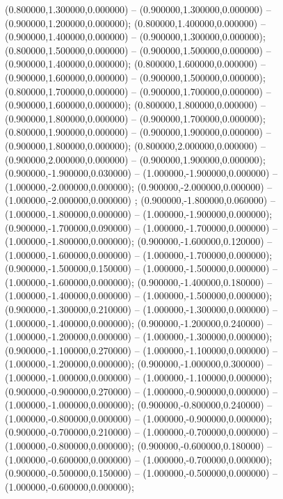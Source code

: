 (0.800000,1.300000,0.000000) -- (0.900000,1.300000,0.000000) -- (0.900000,1.200000,0.000000);
 (0.800000,1.400000,0.000000) -- (0.900000,1.400000,0.000000) -- (0.900000,1.300000,0.000000);
 (0.800000,1.500000,0.000000) -- (0.900000,1.500000,0.000000) -- (0.900000,1.400000,0.000000);
 (0.800000,1.600000,0.000000) -- (0.900000,1.600000,0.000000) -- (0.900000,1.500000,0.000000);
 (0.800000,1.700000,0.000000) -- (0.900000,1.700000,0.000000) -- (0.900000,1.600000,0.000000);
 (0.800000,1.800000,0.000000) -- (0.900000,1.800000,0.000000) -- (0.900000,1.700000,0.000000);
 (0.800000,1.900000,0.000000) -- (0.900000,1.900000,0.000000) -- (0.900000,1.800000,0.000000);
 (0.800000,2.000000,0.000000) -- (0.900000,2.000000,0.000000) -- (0.900000,1.900000,0.000000);
 (0.900000,-1.900000,0.030000) -- (1.000000,-1.900000,0.000000) -- (1.000000,-2.000000,0.000000);
 (0.900000,-2.000000,0.000000) -- (1.000000,-2.000000,0.000000) ;
 (0.900000,-1.800000,0.060000) -- (1.000000,-1.800000,0.000000) -- (1.000000,-1.900000,0.000000);
 (0.900000,-1.700000,0.090000) -- (1.000000,-1.700000,0.000000) -- (1.000000,-1.800000,0.000000);
 (0.900000,-1.600000,0.120000) -- (1.000000,-1.600000,0.000000) -- (1.000000,-1.700000,0.000000);
 (0.900000,-1.500000,0.150000) -- (1.000000,-1.500000,0.000000) -- (1.000000,-1.600000,0.000000);
 (0.900000,-1.400000,0.180000) -- (1.000000,-1.400000,0.000000) -- (1.000000,-1.500000,0.000000);
 (0.900000,-1.300000,0.210000) -- (1.000000,-1.300000,0.000000) -- (1.000000,-1.400000,0.000000);
 (0.900000,-1.200000,0.240000) -- (1.000000,-1.200000,0.000000) -- (1.000000,-1.300000,0.000000);
 (0.900000,-1.100000,0.270000) -- (1.000000,-1.100000,0.000000) -- (1.000000,-1.200000,0.000000);
 (0.900000,-1.000000,0.300000) -- (1.000000,-1.000000,0.000000) -- (1.000000,-1.100000,0.000000);
 (0.900000,-0.900000,0.270000) -- (1.000000,-0.900000,0.000000) -- (1.000000,-1.000000,0.000000);
 (0.900000,-0.800000,0.240000) -- (1.000000,-0.800000,0.000000) -- (1.000000,-0.900000,0.000000);
 (0.900000,-0.700000,0.210000) -- (1.000000,-0.700000,0.000000) -- (1.000000,-0.800000,0.000000);
 (0.900000,-0.600000,0.180000) -- (1.000000,-0.600000,0.000000) -- (1.000000,-0.700000,0.000000);
 (0.900000,-0.500000,0.150000) -- (1.000000,-0.500000,0.000000) -- (1.000000,-0.600000,0.000000);
